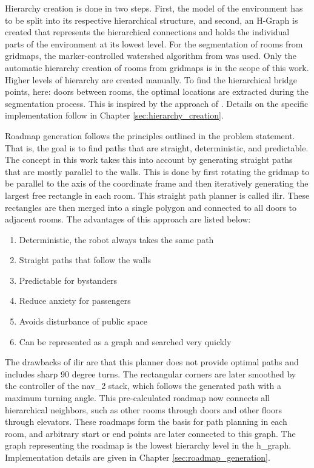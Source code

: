 Hierarchy creation is done in two steps. First, the model of the environment has to be split into its respective hierarchical structure, and second, an H-Graph is created that represents the hierarchical connections and holds the individual parts of the environment at its lowest level. For the segmentation of rooms from gridmaps, the marker-controlled watershed algorithm from \cite{parvati_image_2009} was used. Only the automatic hierarchy creation of rooms from gridmaps is in the scope of this work. Higher levels of hierarchy are created manually. To find the hierarchical bridge points, here: doors between rooms, the optimal locations are extracted during the segmentation process. This is inspired by the approach of \cite{ryu_hierarchical_2020}. Details on the specific implementation follow in Chapter \ref{sec:hierarchy_creation}.

Roadmap generation follows the principles outlined in the problem statement. That is, the goal is to find paths that are straight, deterministic, and predictable. The concept in this work takes this into account by generating straight paths that are mostly parallel to the walls. This is done by first rotating the gridmap to be parallel to the axis of the coordinate frame and then iteratively generating the largest free rectangle in each room. This straight path planner is called \gls{ilir}. These rectangles are then merged into a single polygon and connected to all doors to adjacent rooms. The advantages of this approach are listed below:

\begin{enumerate}
    \item Deterministic, the robot always takes the same path
    \item Straight paths that follow the walls
    \item Predictable for bystanders
    \item Reduce anxiety for passengers
    \item Avoids disturbance of public space
    \item Can be represented as a graph and searched very quickly
\end{enumerate}

The drawbacks of \gls{ilir} are that this planner does not provide optimal paths and includes sharp 90 degree turns. The rectangular corners are later smoothed by the controller of the \gls{nav_2} stack, which follows the generated path with a maximum turning angle. This pre-calculated roadmap now connects all hierarchical neighbors, such as other rooms through doors and other floors through elevators. These roadmaps form the basis for path planning in each room, and arbitrary start or end points are later connected to this graph. The graph representing the roadmap is the lowest hierarchy level in the \gls{h_graph}. Implementation details are given in Chapter \ref{sec:roadmap_generation}.

